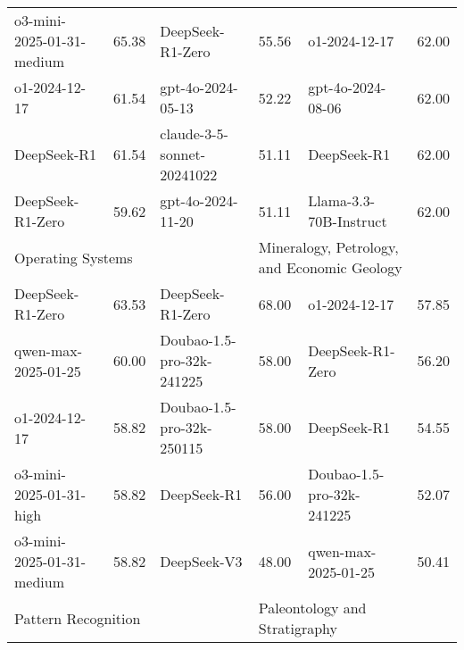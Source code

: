 {\begin{longtable}{p{4.2cm}>{\centering\arraybackslash} p{0.8cm}|p{4.2cm} >{\centering\arraybackslash} p{0.8cm}|p{4.2cm} >{\centering\arraybackslash} p{0.8cm}}
\cellcolor{blue!5} o3-mini-2025-01-31-medium & \cellcolor{blue!2}65.38 & \cellcolor{purple!5} DeepSeek-R1-Zero & \cellcolor{purple!2} 55.56 & \cellcolor{green!5} o1-2024-12-17 & \cellcolor{green!2} 62.00\\
\cellcolor{blue!5} o1-2024-12-17 & \cellcolor{blue!2}61.54 & \cellcolor{purple!5} gpt-4o-2024-05-13 & \cellcolor{purple!2} 52.22 & \cellcolor{green!5} gpt-4o-2024-08-06 & \cellcolor{green!2} 62.00\\
\cellcolor{blue!5} DeepSeek-R1 & \cellcolor{blue!2}61.54 & \cellcolor{purple!5} claude-3-5-sonnet-20241022 & \cellcolor{purple!2} 51.11 & \cellcolor{green!5} DeepSeek-R1 & \cellcolor{green!2} 62.00\\
\cellcolor{blue!5} DeepSeek-R1-Zero & \cellcolor{blue!2}59.62 & \cellcolor{purple!5} gpt-4o-2024-11-20 & \cellcolor{purple!2} 51.11 & \cellcolor{green!5} Llama-3.3-70B-Instruct & \cellcolor{green!2} 62.00\\
\hline
\multicolumn{2}{p{5.15cm}|}{\cellcolor{blue!10} \centering Operating Systems} & \multicolumn{2}{p{5.15cm}|}{\cellcolor{purple!10} \centering Classical Chinese Literature} & \multicolumn{2}{p{5.15cm}}{\cellcolor{green!10} \centering Mineralogy, Petrology, and Economic Geology}\\
\hline
\cellcolor{blue!5} DeepSeek-R1-Zero & \cellcolor{blue!2}63.53 & \cellcolor{purple!5} DeepSeek-R1-Zero & \cellcolor{purple!2} 68.00 & \cellcolor{green!5} o1-2024-12-17 & \cellcolor{green!2} 57.85\\
\cellcolor{blue!5} qwen-max-2025-01-25 & \cellcolor{blue!2}60.00 & \cellcolor{purple!5} Doubao-1.5-pro-32k-241225 & \cellcolor{purple!2} 58.00 & \cellcolor{green!5} DeepSeek-R1-Zero & \cellcolor{green!2} 56.20\\
\cellcolor{blue!5} o1-2024-12-17 & \cellcolor{blue!2}58.82 & \cellcolor{purple!5} Doubao-1.5-pro-32k-250115 & \cellcolor{purple!2} 58.00 & \cellcolor{green!5} DeepSeek-R1 & \cellcolor{green!2} 54.55\\
\cellcolor{blue!5} o3-mini-2025-01-31-high & \cellcolor{blue!2}58.82 & \cellcolor{purple!5} DeepSeek-R1 & \cellcolor{purple!2} 56.00 & \cellcolor{green!5} Doubao-1.5-pro-32k-241225 & \cellcolor{green!2} 52.07\\
\cellcolor{blue!5} o3-mini-2025-01-31-medium & \cellcolor{blue!2}58.82 & \cellcolor{purple!5} DeepSeek-V3 & \cellcolor{purple!2} 48.00 & \cellcolor{green!5} qwen-max-2025-01-25 & \cellcolor{green!2} 50.41\\
\hline
\multicolumn{2}{p{5.15cm}|}{\cellcolor{blue!10} \centering Pattern Recognition} & \multicolumn{2}{p{5.15cm}|}{\cellcolor{purple!10} \centering French Language and Literature} & \multicolumn{2}{p{5.15cm}}{\cellcolor{green!10} \centering Paleontology and Stratigraphy}\\

\end{longtable}}
